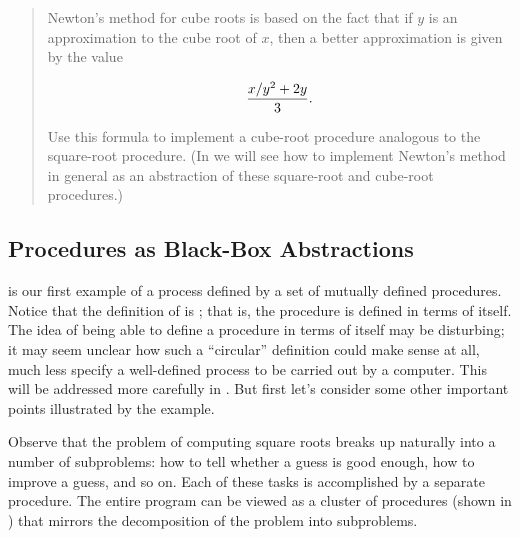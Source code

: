 \begin{quote}
 Newton's method for cube roots is
based on the fact that if \( y \) is an approximation to the cube root of \( x \),
then a better approximation is given by the value
\begin{comment}

\begin{example}
x/y^2 + 2y
----------
    3
\end{example}

\end{comment}

$${{x / y^2} + 2y \over 3}.$$

\noindent
Use this formula to implement a cube-root procedure analogous to the
square-root procedure.  (In  we will see how to implement
Newton's method in general as an abstraction of these square-root and cube-root
procedures.)
\end{quote}

\subsection{Procedures as Black-Box Abstractions}
\label{Section 1.1.8}

 is our first example of a process defined by a set of mutually
defined procedures.  Notice that the definition of  is
; that is, the procedure is defined in terms of itself.  The
idea of being able to define a procedure in terms of itself may be disturbing;
it may seem unclear how such a ``circular'' definition could make sense at all,
much less specify a well-defined process to be carried out by a computer.  This
will be addressed more carefully in .  But first let's
consider some other important points illustrated by the  example.

Observe that the problem of computing square roots breaks up naturally into a
number of subproblems: how to tell whether a guess is good enough, how to
improve a guess, and so on.  Each of these tasks is accomplished by a separate
procedure.  The entire  program can be viewed as a cluster of
procedures (shown in ) that mirrors the decomposition of the
problem into subproblems.

